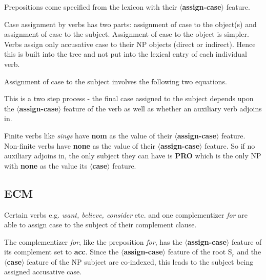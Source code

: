 
Prepositions come specified from the lexicon with their {\bf $\langle$assign-case$\rangle$}
feature.



Case assignment by verbs has two parts: assignment of case to the object(s) and
assignment of case to the subject. Assignment of case to the object is simpler.
Verbs assign only accusative case to their NP objects (direct or indirect).
Hence this is built into the tree and not put into the lexical entry of
each individual verb.


Assignment of case to the subject involves the following two equations.




This is a two step process - the final case assigned to the subject depends upon
the {\bf $\langle$assign-case$\rangle$} feature of the verb as well as whether an
auxiliary verb adjoins in. 

Finite verbs like {\em sings} have {\bf nom} as the value of their
{\bf $\langle$assign-case$\rangle$} feature. Non-finite verbs have {\bf none}
as the value of their
{\bf $\langle$assign-case$\rangle$} feature. So if no auxiliary adjoins in,
the only subject they can have is {\bf PRO} which is the only NP with
{\bf none}
as the value its {\bf $\langle$case$\rangle$} feature.

\subsection{ECM}
Certain verbs e.g. {\em want, believe, consider} etc. and one complementizer
{\em for} are able to assign case to the subject of their complement clause. 

The complementizer {\em for}, like the preposition {\em for}, has the 
{\bf $\langle$assign-case$\rangle$} feature of its complement set
to {\bf acc}. Since the {\bf $\langle$assign-case$\rangle$} feature of
the root S$_{r}$ and the {\bf $\langle$case$\rangle$} feature of the 
NP subject are co-indexed, this leads to the subject being assigned 
accusative case.

